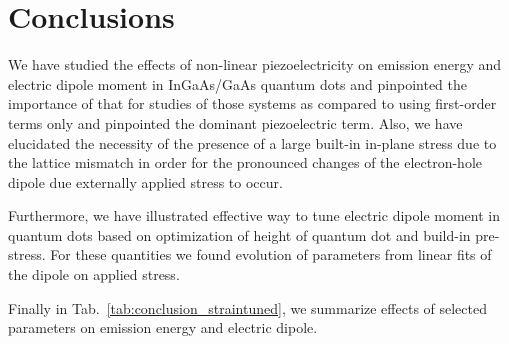 %










\newpage

\section{Conclusions}
We have studied the effects of non-linear piezoelectricity on emission energy and electric dipole moment in InGaAs/GaAs quantum dots and pinpointed the importance of that for studies of those systems as compared to using first-order terms only and pinpointed the dominant piezoelectric term. Also, we have elucidated the necessity of the presence of a large built-in in-plane stress due to the lattice mismatch in order for the pronounced changes of the electron-hole dipole due externally applied stress to occur. 

Furthermore, we have illustrated effective way to tune electric dipole moment in quantum dots based on optimization of height of quantum dot and build-in pre-stress. For these quantities we found evolution of parameters from linear fits of the dipole on applied stress. 

Finally in Tab.~\ref{tab:conclusion_straintuned}, we summarize effects of selected parameters on emission energy and electric dipole.

